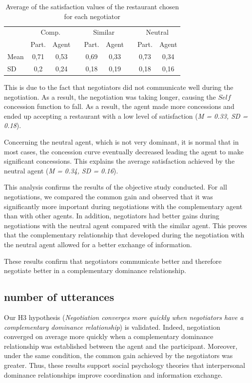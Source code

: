 \documentclass{llncs}
\begin{document}
	\begin{table}
	\centering
	\caption{Average of the satisfaction values of the restaurant chosen for each negotiator} 
	\begin{tabular} {lcccccccc}
		\hline
		\hline
		& \multicolumn{2}{c}{Comp.} & & \multicolumn{2}{c}{Similar}& & \multicolumn{2}{c}{Neutral} \\ %
		\cline{2-3} \cline{5-6} \cline{8-9} %
		& Part. & Agent & & Part. & Agent & &  Part. &Agent \\ \hline
		Mean &0,71 & 0,53 & &  0,69 & 0,33 & & 0,73 & 0,34 \\
		SD & 0,2 & 0,24 & &  0,18 & 0,19 & & 0,18 & 0,16 \\
		\hline
		\hline
	\end{tabular}
	\label{tab:gainPerceptif}
	
\end{table}

This is due to the fact that negotiators did not communicate well during the negotiation. As a result, the negotiation was taking longer, causing the $Self$ concession function to fall. As a result, the agent made more concessions and ended up accepting a restaurant with a low level of satisfaction (\emph{M = 0.33, SD = 0.18}).

Concerning the neutral agent, which is not very dominant, it is normal that in most cases, the concession curve eventually decreased leading the agent to make significant concessions. This explains the average satisfaction achieved by the neutral agent (\emph{M = 0.34, SD = 0.16}).

This analysis confirms the results of the objective study conducted.
For all negotiations, we compared the common gain and observed that it was significantly more important during negotiations with the complementary agent than with other agents. In addition, negotiators had better gains during negotiations with the neutral agent compared with the similar agent. This proves that the complementary relationship that developed during the negotiation with the neutral agent allowed for a better exchange of information. 

These results confirm that negotiators communicate better and therefore negotiate better in a complementary dominance relationship.  


\subsection{number of utterances}
Our H3 hypothesis (\textit{Negotiation converges more quickly when negotiators have a complementary dominance relationship}) is validated. Indeed, negotiation converged on average more quickly when a complementary dominance relationship was established between the agent and the participant. Moreover, under the same condition, the common gain achieved by the negotiators was greater. Thus, these results support social psychology theories that interpersonal dominance relationships improve coordination and information exchange.
\end{document}
